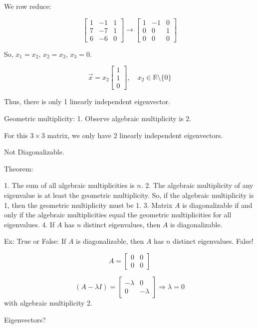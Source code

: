 \documentclass{article}
\begin{document}
We row reduce:

\[
\begin{bmatrix} 
1 & -1 & 1 \\ 
7 & -7 & 1 \\ 
6 & -6 & 0 
\end{bmatrix}
\rightarrow
\begin{bmatrix} 
1 & -1 & 0 \\ 
0 & 0 & 1 \\ 
0 & 0 & 0 
\end{bmatrix}
\]

So, \( x_1 = x_2 \), \( x_2 = x_2 \), \( x_3 = 0 \). 

\[ \vec{x} = x_2 \begin{bmatrix} 1 \\ 1 \\ 0 \end{bmatrix}, \quad x_2 \in \mathbb{R} \setminus \{0\} \]

Thus, there is only 1 linearly independent eigenvector. 

Geometric multiplicity: 1. Observe algebraic multiplicity is 2. 

For this \( 3 \times 3 \) matrix, we only have 2 linearly independent eigenvectors. 

Not Diagonalizable.

Theorem:

1. The sum of all algebraic multiplicities is \( n \).
2. The algebraic multiplicity of any eigenvalue is at least the geometric multiplicity. So, if the algebraic multiplicity is 1, then the geometric multiplicity must be 1.
3. Matrix \( A \) is diagonalizable if and only if the algebraic multiplicities equal the geometric multiplicities for all eigenvalues.
4. If \( A \) has \( n \) distinct eigenvalues, then \( A \) is diagonalizable.

Ex: True or False: If \( A \) is diagonalizable, then \( A \) has \( n \) distinct eigenvalues. False!

\[ A = \begin{bmatrix} 0 & 0 \\ 0 & 0 \end{bmatrix} \]

\[ (A - \lambda I) = \begin{bmatrix} -\lambda & 0 \\ 0 & -\lambda \end{bmatrix} \Rightarrow \lambda = 0 \] with algebraic multiplicity 2. 

Eigenvectors? 
\end{document}
